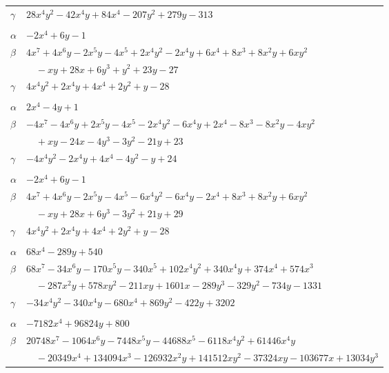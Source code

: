 \documentclass[11pt]{article}
\begin{document}
\begin{longtable}{@{}ll@{}}
$\gamma$ & $28x^{4}y^{2}-42x^{4}y+84x^{4}-207y^{2}+279y-313$\\
\addlinespace[3pt]
\multicolumn{2}{@{}l}{$\{i,j\}=\{4,19\}$, $k_{ij}=3^{3}$}\\
$\alpha$ & $-2x^{4}+6y-1$\\
$\beta$ & $4x^{7}+4x^{6}y-2x^{5}y-4x^{5}+2x^{4}y^{2}-2x^{4}y+6x^{4}+8x^{3}+8x^{2}y+6xy^{2}$\\
 & $\quad -xy+28x+6y^{3}+y^{2}+23y-27$\\
$\gamma$ & $4x^{4}y^{2}+2x^{4}y+4x^{4}+2y^{2}+y-28$\\
\addlinespace[3pt]
\multicolumn{2}{@{}l}{$\{i,j\}=\{4,20\}$, $k_{ij}=5^{2}$}\\
$\alpha$ & $2x^{4}-4y+1$\\
$\beta$ & $-4x^{7}-4x^{6}y+2x^{5}y-4x^{5}-2x^{4}y^{2}-6x^{4}y+2x^{4}-8x^{3}-8x^{2}y-4xy^{2}$\\
 & $\quad +xy-24x-4y^{3}-3y^{2}-21y+23$\\
$\gamma$ & $-4x^{4}y^{2}-2x^{4}y+4x^{4}-4y^{2}-y+24$\\
\addlinespace[3pt]
\multicolumn{2}{@{}l}{$\{i,j\}=\{4,24\}$, $k_{ij}=3^{3}$}\\
$\alpha$ & $-2x^{4}+6y-1$\\
$\beta$ & $4x^{7}+4x^{6}y-2x^{5}y-4x^{5}-6x^{4}y^{2}-6x^{4}y-2x^{4}+8x^{3}+8x^{2}y+6xy^{2}$\\
 & $\quad -xy+28x+6y^{3}-3y^{2}+21y+29$\\
$\gamma$ & $4x^{4}y^{2}+2x^{4}y+4x^{4}+2y^{2}+y-28$\\
\addlinespace[3pt]
\multicolumn{2}{@{}l}{$\{i,j\}=\{5,17\}$, $k_{ij}=2^{2}\cdot 3^{3}\cdot 5$}\\
$\alpha$ & $68x^{4}-289y+540$\\
$\beta$ & $68x^{7}-34x^{6}y-170x^{5}y-340x^{5}+102x^{4}y^{2}+340x^{4}y+374x^{4}+574x^{3}$\\
 & $\quad -287x^{2}y+578xy^{2}-211xy+1601x-289y^{3}-329y^{2}-734y-1331$\\
$\gamma$ & $-34x^{4}y^{2}-340x^{4}y-680x^{4}+869y^{2}-422y+3202$\\
\addlinespace[3pt]
\multicolumn{2}{@{}l}{$\{i,j\}=\{5,18\}$, $k_{ij}=2^{5}\cdot 5^{2}$}\\
$\alpha$ & $-7182x^{4}+96824y+800$\\
$\beta$ & $20748x^{7}-1064x^{6}y-7448x^{5}y-44688x^{5}-6118x^{4}y^{2}+61446x^{4}y$\\
 & $\quad -20349x^{4}+134094x^{3}-126932x^{2}y+141512xy^{2}-37324xy-103677x+13034y^{3}$\\

\end{longtable}
\end{document}
